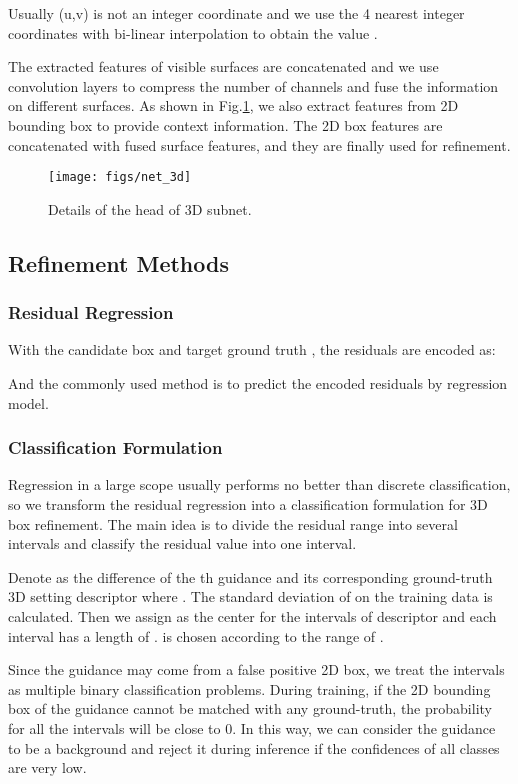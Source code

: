 \documentclass[10pt,twocolumn,letterpaper]{article}
\begin{document}
Usually (u,v) is not an integer coordinate and we use the 4 nearest integer coordinates with bi-linear interpolation to obtain the value .

The extracted features of visible surfaces are concatenated and we use convolution layers to compress the number of channels and fuse the information on different surfaces. As shown in Fig.\ref{fig:net_3d}, we also extract features from 2D bounding box to provide context information. The 2D box features are concatenated with fused surface features, and they are finally used for refinement. 

\begin{figure}[!h]
\centering
\texttt{[image: figs/net\_3d]}
\caption{Details of the head of 3D subnet.}
\label{fig:net_3d}
\end{figure}


\subsection{Refinement Methods}
\label{sec:refine}

\subsubsection{Residual Regression}
With the candidate box  and target ground truth , the residuals are encoded as:

And the commonly used method is to predict the encoded residuals by regression model.

\subsubsection{Classification Formulation}
\label{sec:class}
Regression in a large scope usually performs no better than discrete classification, so we transform the residual regression into a classification formulation for 3D box refinement.
The main idea is to divide the residual range into several intervals and classify the residual value into one interval.


Denote  as the difference of the th guidance and its corresponding ground-truth 3D setting descriptor  where . 
The standard deviation  of  on the training data is calculated. Then we assign  as the center for the intervals of descriptor  and each interval has a length of .  is chosen according to the range of .

Since the guidance may come from a false positive 2D box, we treat the intervals as multiple binary classification problems. During training, if the 2D bounding box of the guidance cannot be matched with any ground-truth, the probability for all the intervals will be close to 0.  In this way, we can consider the guidance to be a background and reject it during inference if the confidences of all classes are very low. 
\end{document}
